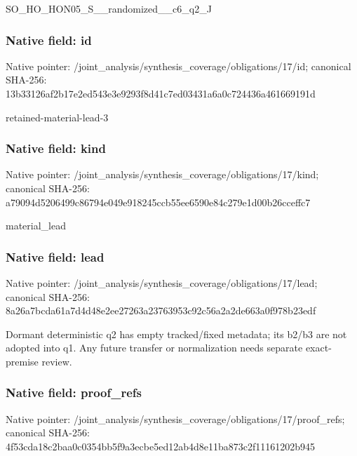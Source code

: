 \documentclass[10pt,a4paper]{article}
\begin{document}
\begingroup\raggedright\sloppy SO\_\allowbreak{}HO\_\allowbreak{}HON05\_\allowbreak{}S\_\allowbreak{}\_\allowbreak{}randomized\_\allowbreak{}\_\allowbreak{}c6\_\allowbreak{}q2\_\allowbreak{}J\par\endgroup

\subsubsection{Native field: id}
Native pointer: /joint\_\allowbreak{}analysis/synthesis\_\allowbreak{}coverage/obligations/17/id; canonical SHA-256: 13b33126af2b17e2ed543e3e9293f8d41c7ed03431a6a0c724436a461669191d

\begingroup\raggedright\sloppy retained-material-lead-3\par\endgroup

\subsubsection{Native field: kind}
Native pointer: /joint\_\allowbreak{}analysis/synthesis\_\allowbreak{}coverage/obligations/17/kind; canonical SHA-256: a79094d5206499c86794e049e918245ccb55ee6590e84c279e1d00b26cceffc7

\begingroup\raggedright\sloppy material\_\allowbreak{}lead\par\endgroup

\subsubsection{Native field: lead}
Native pointer: /joint\_\allowbreak{}analysis/synthesis\_\allowbreak{}coverage/obligations/17/lead; canonical SHA-256: 8a26a7bcda61a7d4d48e2ee27263a23763953c92c56a2a2de663a0f978b23edf

\begingroup\raggedright\sloppy Dormant deterministic q2 has empty tracked/\allowbreak{}fixed metadata;\allowbreak{} its b2/\allowbreak{}b3 are not adopted into q1. Any future transfer or normalization needs separate exact-premise review.\par\endgroup

\subsubsection{Native field: proof\_\allowbreak{}refs}
Native pointer: /joint\_\allowbreak{}analysis/synthesis\_\allowbreak{}coverage/obligations/17/proof\_\allowbreak{}refs; canonical SHA-256: 4f53cda18c2baa0c0354bb5f9a3ecbe5ed12ab4d8e11ba873c2f11161202b945
\end{document}
